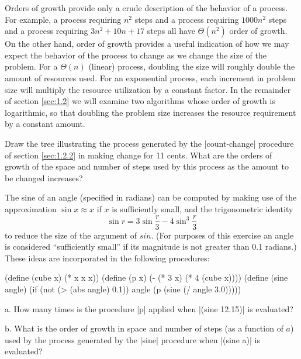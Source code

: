 Orders of growth provide only a crude description of the behavior of a
process.  For example, a process requiring $n^2$ steps and a process
requiring $1000n^2$ steps and a process requiring $3n^2 + 10n + 17$
steps all have $\Theta(n^2)$ order of growth.  On the other hand,
order of growth provides a useful indication of how we may expect the
behavior of the process to change as we change the size of the
problem.  For a $\Theta(n)$ (linear) process, doubling the size will
roughly double the amount of resources used.  For an exponential
process, each increment in problem size will multiply the resource
utilization by a constant factor.  In the remainder of section
\ref{sec:1.2} we will examine two algorithms whose order of growth is
logarithmic, so that doubling the problem size increases the resource
requirement by a constant amount.

\begin{Exercise}
\label{exc:1.14}
Draw the tree illustrating the process generated by the \scheme|count-change| procedure of section \ref{sec:1.2.2} in making
change for 11 cents.  What are the orders of growth of the space and
number of steps used by this process as the amount to be changed
increases?
\end{Exercise}

\begin{Exercise}
\label{exc:1.15}
The sine of an angle (specified in radians) can be computed by making
use of the approximation $\sin x \approx x$ if $x$ is sufficiently small, and the trigonometric
identity $$\sin r = 3 \sin \frac{r}{3} - 4 \sin^3 \frac{r}{3}$$
to reduce the size of the argument of $sin$.  (For purposes of
this exercise an angle is considered ``sufficiently small'' if its
magnitude is not greater than 0.1 radians.) These ideas are
incorporated in the following procedures:

\begin{schemedisplay}
(define (cube x) (* x x x))
(define (p x) (- (* 3 x) (* 4 (cube x))))
(define (sine angle)
   (if (not (> (abs angle) 0.1))
       angle
       (p (sine (/ angle 3.0)))))
\end{schemedisplay}
a.  How many times is the procedure \scheme|p| 
applied when \scheme|(sine 12.15)| is evaluated?

b.  What is the order of growth in space and number of steps (as a
function of $a$) used by the process generated by the \scheme|sine|
procedure when \scheme|(sine a)| is evaluated?
\end{Exercise}


